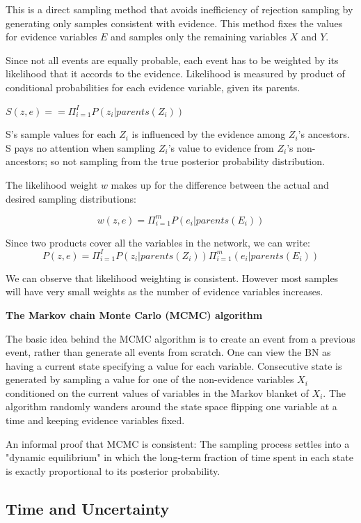 \documentclass{article}
\begin{document}
This is a direct sampling method that avoids inefficiency of rejection sampling by generating only samples consistent with evidence. This method fixes the values for evidence variables $E$ and samples only the remaining variables $X$ and $Y$. \newline

Since not all events are equally probable, each event has to be weighted by its likelihood that it accords to the evidence. Likelihood is measured by product of conditional probabilities for each evidence variable, given its parents. 

 $S(z,e) = = \Pi_{i=1}^I P(z_i | parents(Z_i))$

 S's sample values for each $Z_i$ is influenced by the evidence among $Z_i$'s ancestors. S pays no attention when sampling $Z_i$'s value to evidence from $Z_i$'s non-ancestors; so not sampling from the true posterior probability distribution.

The likelihood weight $w$ makes up for the difference between the actual and desired sampling distributions: 

$$w(z,e) = \Pi_{i=1}^m P(e_i | parents(E_i))$$

Since two products cover all the variables in the network, we can write: $$P(z,e) = \Pi_{i=1}^I P(z_i |parents(Z_i))\Pi_{i=1}^m(e_i | parents(E_i))$$

We can observe that likelihood weighting is consistent. However most samples will have very small weights as the number of evidence variables increases. 

\textbf{The Markov chain Monte Carlo (MCMC) algorithm} 

The basic idea behind the MCMC algorithm is to create an event from a previous event, rather than generate all events from scratch. One can view the BN as having a current state specifying a value for each variable. Consecutive state is generated by sampling a value for one of the non-evidence variables $X_i$ conditioned on the current values of variables in the Markov blanket of $X_i$. The algorithm randomly wanders around the state space flipping one variable at a time and keeping evidence variables fixed. \newline

An informal proof that MCMC is consistent: The sampling process settles into a "dynamic equilibrium" in which the long-term fraction of time spent in each state is exactly proportional to its posterior probability. 

\subsection{Time and Uncertainty}
\end{document}
